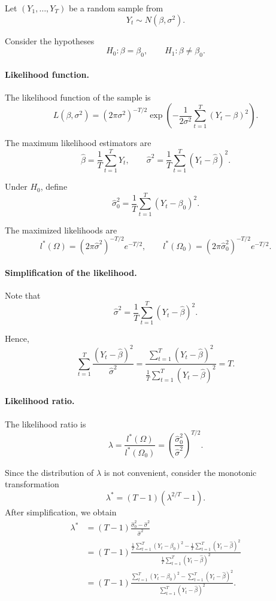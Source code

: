 Let $(Y_1,\dots,Y_T)$ be a random sample from
\[
Y_t \sim N(\beta,\sigma^2).
\]

Consider the hypotheses
\[
H_0:\beta=\beta_0,
\qquad
H_1:\beta\neq\beta_0.
\]

\paragraph{Likelihood function.}

The likelihood function of the sample is
\[
L(\beta,\sigma^2)
=
(2\pi\sigma^2)^{-T/2}
\exp\!\left(
-\frac{1}{2\sigma^2}
\sum_{t=1}^T (Y_t-\beta)^2
\right).
\]

The maximum likelihood estimators are
\[
\hat{\beta} = \frac{1}{T}\sum_{t=1}^T Y_t,
\qquad
\hat{\sigma}^2 = \frac{1}{T}\sum_{t=1}^T (Y_t-\hat{\beta})^2.
\]

Under $H_0$, define
\[
\hat{\sigma}_0^2 = \frac{1}{T}\sum_{t=1}^T (Y_t-\beta_0)^2.
\]

The maximized likelihoods are
\[
l^*(\Omega)
=
(2\pi\hat{\sigma}^2)^{-T/2} e^{-T/2},
\qquad
l^*(\Omega_0)
=
(2\pi\hat{\sigma}_0^2)^{-T/2} e^{-T/2}.
\]


\paragraph{Simplification of the likelihood.}

Note that
\[
\hat{\sigma}^2
=
\frac{1}{T}\sum_{t=1}^T (Y_t-\hat{\beta})^2.
\]

Hence,
\[
\sum_{t=1}^T \frac{(Y_t-\hat{\beta})^2}{\hat{\sigma}^2}
=
\frac{\sum_{t=1}^T (Y_t-\hat{\beta})^2}
{\frac{1}{T}\sum_{t=1}^T (Y_t-\hat{\beta})^2}
=
T.
\]



\paragraph{Likelihood ratio.}

The likelihood ratio is
\[
\lambda
=
\frac{l^*(\Omega)}{l^*(\Omega_0)}
=
\left(
\frac{\hat{\sigma}_0^2}{\hat{\sigma}^2}
\right)^{T/2}.
\]

Since the distribution of $\lambda$ is not convenient, consider the monotonic transformation
\[
\lambda^*
=
(T-1)\left(\lambda^{2/T} - 1\right).
\]
After simplification, we obtain
\begin{align*}
\lambda^*
&=
(T-1)\frac{\hat{\sigma}_0^2-\hat{\sigma}^2}{\hat{\sigma}^2} \\
&=
(T-1)
\frac{
\frac{1}{T}\sum_{t=1}^T (Y_t-\beta_0)^2
-
\frac{1}{T}\sum_{t=1}^T (Y_t-\hat{\beta})^2
}{
\frac{1}{T}\sum_{t=1}^T (Y_t-\hat{\beta})^2
} \\
&=
(T-1)
\frac{
\sum_{t=1}^T (Y_t-\beta_0)^2
-
\sum_{t=1}^T (Y_t-\hat{\beta})^2
}{
\sum_{t=1}^T (Y_t-\hat{\beta})^2
}.
\end{align*}

